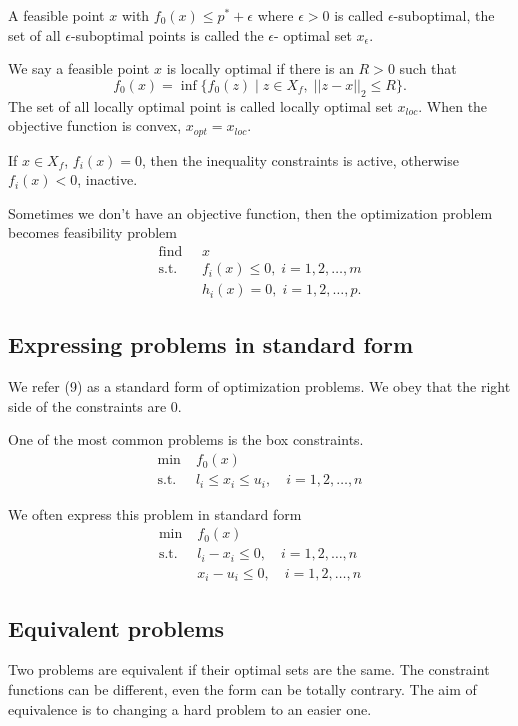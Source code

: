 \documentclass[lang=en,color=blue,mode=fancy,titlestyle=hang]{elegantbook}
\begin{document}
A feasible point $x$ with $f_0(x) \leq p^* + \epsilon$ where $\epsilon > 0$ is called
$\epsilon$-suboptimal, the set of all $\epsilon$-suboptimal points is called the $\epsilon$-
optimal set $x_{\epsilon}$.

We say a feasible point $x$ is locally optimal if there is an $R > 0$ such that
\[
f_0(x) = \inf \{ f_0(z) \;|\; z \in X_f, \; ||z - x||_2 \leq R \}.
\]
The set of all locally optimal point is called locally optimal set $x_{loc}$. When the
objective function is convex, $x_{opt} = x_{loc}$.

If $x \in X_f$, $f_i(x) = 0$, then the inequality constraints is active, otherwise
$f_i(x) < 0$, inactive.

Sometimes we don't have an objective function, then the optimization problem becomes
feasibility problem
\begin{align*}
  \text{find } \; &x \\
  \text{s.t. }\; &f_i(x) \leq 0, \; i = 1, 2, \ldots, m \\
  &h_i(x) = 0, \; i = 1, 2, \ldots, p.
\end{align*}

\subsection{Expressing problems in standard form}
We refer (9) as a standard form of optimization problems. We obey that the right side
of the constraints are 0.

One of the most common problems is the box constraints.
\begin{align*}
  \min \; &f_0(x) \\
  \text{s.t.}\; &l_i \leq x_i \leq u_i,\quad i = 1,2,\ldots,n
\end{align*}

We often express this problem in standard form
\begin{align*}
  \min \; &f_0(x) \\
  \text{s.t.}\; &l_i - x_i \leq 0,\quad i = 1,2,\ldots,n \\
  &x_i - u_i \leq 0,\quad i = 1,2,\ldots,n
\end{align*}

\subsection{Equivalent problems}
Two problems are equivalent if their optimal sets are the same. The constraint functions
can be different, even the form can be totally contrary. The aim of equivalence is to
changing a hard problem to an easier one.
\end{document}

